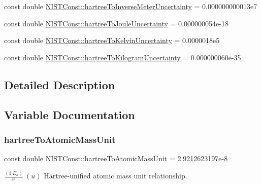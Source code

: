 \begin{DoxyCompactItemize}
\item 
const double \hyperlink{group___n_i_s_t_const-_hartree_ga0554c0859210dac9ff459c44c1bd70ca}{N\+I\+S\+T\+Const\+::hartree\+To\+Inverse\+Meter\+Uncertainty} = 0.\+000000000013e7
\item 
const double \hyperlink{group___n_i_s_t_const-_hartree_ga2e016fc3c1dbb3e68befcfb929034c85}{N\+I\+S\+T\+Const\+::hartree\+To\+Joule\+Uncertainty} = 0.\+000000054e-\/18
\item 
const double \hyperlink{group___n_i_s_t_const-_hartree_gace6578c3f664e11b0eba73a20efd7f16}{N\+I\+S\+T\+Const\+::hartree\+To\+Kelvin\+Uncertainty} = 0.\+0000018e5
\item 
const double \hyperlink{group___n_i_s_t_const-_hartree_ga88a5e0e81776199fdc7d4b5a424196a8}{N\+I\+S\+T\+Const\+::hartree\+To\+Kilogram\+Uncertainty} = 0.\+000000060e-\/35
\end{DoxyCompactItemize}


\subsection{Detailed Description}


\subsection{Variable Documentation}
\mbox{\label{group___n_i_s_t_const-_hartree_gafc823cd4d405fbad0af7abf03a28917d}} 
\subsubsection{\texorpdfstring{hartree\+To\+Atomic\+Mass\+Unit}{hartreeToAtomicMassUnit}}
{\footnotesize\ttfamily const double N\+I\+S\+T\+Const\+::hartree\+To\+Atomic\+Mass\+Unit = 2.\+9212623197e-\/8}

$\frac{(1\ E_h)}{c^2} \ (u)$ Hartree-\/unified atomic mass unit relationship. \mbox{\label{group___n_i_s_t_const-_hartree_ga7be8625774a1b159233ac984e904cdb2}} 
